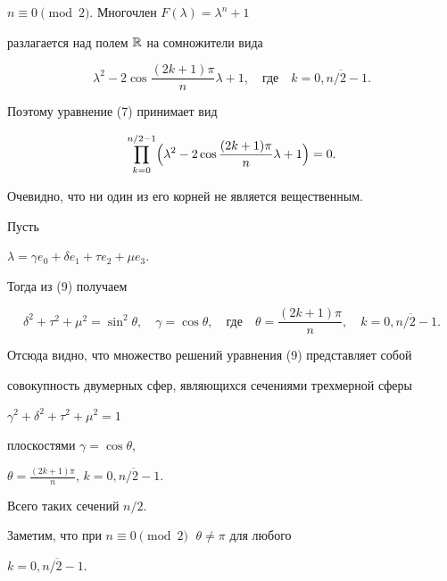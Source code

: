 \begin{case} $n\equiv 0\pmod{2}$. Многочлен $F(\lambda)=\lambda^n+1$ 


разлагается над полем $\Bbb R$ на сомножители вида 


\begin{equation} 


\lambda^2-2\cos\frac{(2k+1)\pi}{n}\lambda+1,\quad 


\text{где}\quad k=\overline{0,n/2-1}. 


\end{equation} 


Поэтому уравнение (7) принимает вид


\begin{equation} 


\prod^{n/2-1}_{k=0}\Bigl(\lambda^2-2\cos 


\frac{(2k+1)\pi}{n}\lambda+1\Bigr)=0. 


\end{equation} 


Очевидно, что ни один из его корней не является вещественным. 


 


Пусть 


$\lambda=\gamma e_0+\delta e_1+\tau e_2+\mu e_3$. 


Тогда из (9) получаем


$$ 


\delta^2+\tau^2+\mu^2=\sin^2\theta,\quad \gamma=\cos\theta,\quad 


\text{где}\quad \theta=\frac{(2k+1)\pi}{n},\quad 


k=\overline{0,n/2-1}. 


$$ 


Отсюда видно, что множество решений уравнения (9) представляет собой 


совокупность двумерных сфер, являющихся сечениями трехмерной сферы 


$\gamma^2+\delta^2+\tau^2+\mu^2=1$ 


плоскостями $\gamma=\cos\theta$, 


$\theta=\frac{(2k+1)\pi}{n}$, $k=\overline{0,n/2-1}$. 


Всего таких сечений $n/2$. 


 


Заметим, что при $n\equiv 0\pmod{2}\;$ $\theta\ne\pi$ для любого 


$k=\overline{0,n/2-1}$. 


\end{case} 


